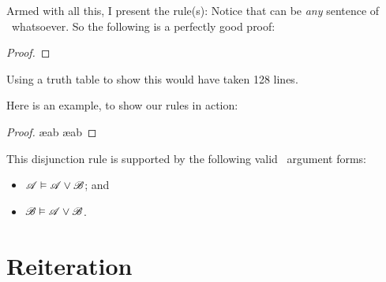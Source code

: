 Armed with all this, I present the  rule(s):
Notice that  can be \emph{any} sentence of \TFL\ whatsoever. So the following is a perfectly good proof:
\begin{proof}
\end{proof}
Using a truth table to show this would have taken 128 lines. 

Here is an example, to show our rules in action: \begin{proof}
	\ae{ab}
	\ae{ab}
\end{proof}

This disjunction rule is supported by the following valid \TFL\ argument forms: \begin{itemize}
	\item $\mathscr{A}\vDash\mathscr{A}\vee\mathscr{B}$; and 
	\item $\mathscr{B}\vDash\mathscr{A}\vee\mathscr{B}$.
\end{itemize}

\section{Reiteration}\label{reit}

